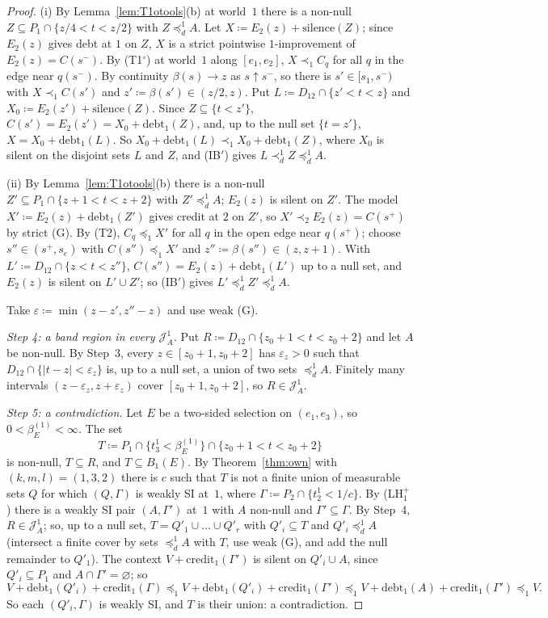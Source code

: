 \documentclass[11pt]{article}
\theoremstyle{definition}\newtheorem{definition}[theorem]{Definition}
\theoremstyle{remark}\newtheorem{remark}[theorem]{Remark}
\newcommand{\debt}{\mathrm{debt}}
\newcommand{\cred}{\mathrm{credit}}
\newcommand{\sil}{\mathrm{silence}}
\newcommand{\Jid}{\mathcal J}
\newcommand{\To}{\textup{(T1$^\circ$)}}
\begin{document}
\begin{proof}
(i) By Lemma~\ref{lem:T1otools}(b) at world~$1$ there is a non-null
$Z\subseteq P_1\cap\{z/4<t<z/2\}$ with $Z\preceq^1_dA$. Let
$X\coloneqq E_2(z)+\sil(Z)$; since $E_2(z)$ gives debt at $1$ on $Z$, $X$ is a
strict pointwise $1$-improvement of $E_2(z)=C(s^-)$. By \To{} at world~$1$
along $[e_1,e_2]$, $X\prec_1C_q$ for all $q$ in the edge near $q(s^-)$. By
continuity $\beta(s)\to z$ as $s\uparrow s^-$, so there is $s'\in[s_1,s^-)$
with $X\prec_1C(s')$ and $z'\coloneqq\beta(s')\in(z/2,z)$. Put
$L\coloneqq D_{12}\cap\{z'<t<z\}$ and $X_0\coloneqq E_2(z')+\sil(Z)$. Since
$Z\subseteq\{t<z'\}$, $C(s')=E_2(z')=X_0+\debt_1(Z)$, and, up to the null set
$\{t=z'\}$, $X=X_0+\debt_1(L)$. So $X_0+\debt_1(L)\prec_1X_0+\debt_1(Z)$,
where $X_0$ is silent on the disjoint sets $L$ and $Z$, and (IB$'$) gives
$L\prec^1_dZ\preceq^1_dA$.

(ii) By Lemma~\ref{lem:T1otools}(b) there is a non-null $Z'\subseteq
P_1\cap\{z+1<t<z+2\}$ with $Z'\preceq^1_dA$; $E_2(z)$ is silent on $Z'$. The
model $X'\coloneqq E_2(z)+\debt_1(Z')$ gives credit at $2$ on $Z'$, so
$X'\prec_2E_2(z)=C(s^+)$ by strict (G). By (T2), $C_q\preceq_1X'$ for all
$q$ in the open edge near $q(s^+)$; choose $s''\in(s^+,s_e)$ with
$C(s'')\preceq_1X'$ and $z''\coloneqq\beta(s'')\in(z,z+1)$. With
$L'\coloneqq D_{12}\cap\{z<t<z''\}$, $C(s'')=E_2(z)+\debt_1(L')$ up to a
null set, and $E_2(z)$ is silent on $L'\cup Z'$; so (IB$'$) gives
$L'\preceq^1_dZ'\preceq^1_dA$.

Take $\varepsilon\coloneqq\min(z-z',z''-z)$ and use weak (G).

\emph{Step 4: a band region in every $\Jid^1_A$.} Put $R\coloneqq
D_{12}\cap\{z_0+1<t<z_0+2\}$ and let $A$ be non-null. By Step~3, every
$z\in[z_0+1,z_0+2]$ has $\varepsilon_z>0$ such that
$D_{12}\cap\{|t-z|<\varepsilon_z\}$ is, up to a null set, a union of two
sets $\preceq^1_dA$. Finitely many intervals $(z-\varepsilon_z,
z+\varepsilon_z)$ cover $[z_0+1,z_0+2]$, so $R\in\Jid^1_A$.

\emph{Step 5: a contradiction.} Let $E$ be a two-sided selection on
$(e_1,e_3)$, so $0<\beta^{(1)}_E<\infty$. The set
\[
 T\coloneqq P_1\cap\{t^1_3<\beta^{(1)}_E\}\cap\{z_0+1<t<z_0+2\}
\]
is non-null, $T\subseteq R$, and $T\subseteq B_1(E)$. By
Theorem~\ref{thm:own} with $(k,m,l)=(1,3,2)$ there is $c$ such that $T$ is
not a finite union of measurable sets $Q$ for which $(Q,\Gamma)$ is weakly
SI at~$1$, where $\Gamma\coloneqq P_2\cap\{t^1_2<1/c\}$. By (LH$^+_1$)
there is a weakly SI pair $(A,\Gamma')$ at~$1$ with $A$ non-null and
$\Gamma'\subseteq\Gamma$. By Step~4, $R\in\Jid^1_A$; so, up to a null set,
$T=Q'_1\cup\dots\cup Q'_r$ with $Q'_i\subseteq T$ and $Q'_i\preceq^1_dA$
(intersect a finite cover by sets $\preceq^1_dA$ with $T$, use weak (G),
and add the null remainder to $Q'_1$). The context $V+\cred_1(\Gamma')$ is
silent on $Q'_i\cup A$, since $Q'_i\subseteq P_1$ and $A\cap\Gamma'=
\varnothing$; so
\[
 V+\debt_1(Q'_i)+\cred_1(\Gamma)\preceq_1V+\debt_1(Q'_i)+\cred_1(\Gamma')
 \preceq_1V+\debt_1(A)+\cred_1(\Gamma')\preceq_1V.
\]
So each $(Q'_i,\Gamma)$ is weakly SI, and $T$ is their union: a
contradiction.
\end{proof}
\end{document}
